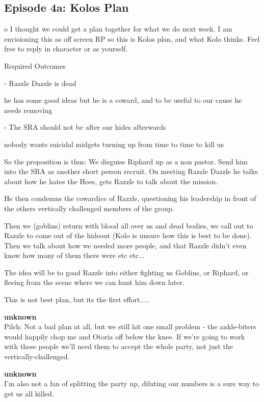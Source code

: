 \subsection{Episode 4a: Kolos Plan}

o I thought we could get a plan together for what we do next week. I am envisioning this as off screen RP so this is Kolos plan, and what Kolo thinks. Feel free to reply in character or as yourself.\medskip

Required Outcomes\medskip

- Razzle Dazzle is dead\medskip

he has some good ideas but he is a coward, and to be useful to our cause he needs removing\medskip

- The SRA should not be after our hides afterwards\medskip

nobody wants suicidal midgets turning up from time to time to kill us\medskip

So the proposition is thus: We disguise Riphard up as a non pastor. Send him into the SRA as another short person recruit. On meeting Razzle Dazzle he talks about how he hates the Hoes, gets Razzle to talk about the mission.\medskip

He then condemns the cowardice of Razzle, questioning his leadership in front of the others vertically challenged members of the group.\medskip

Then we (goblins) return with blood all over us and dead bodies, we call out to Razzle to come out of the hideout (Kolo is unsure how this is best to be done). Then we talk about how we needed more people, and that Razzle didn't even know how many of them there were etc etc...\medskip

The idea will be to goad Razzle into either fighting us Goblins, or Riphard, or fleeing from the scene where we can hunt him down later.\medskip

This is not best plan, but its the first effort.....\medskip

\textbf{unknown}\\
Pilch: Not a bad plan at all, but we still hit one small problem - the ankle-biters would happily chop me and Otoria off below the knee. If we're going to work with these people we'll need them to accept the whole party, not just the vertically-challenged.\medskip

\textbf{unknown}\\
I'm also not a fan of splitting the party up, diluting our numbers is a sure way to get us all killed.\medskip

